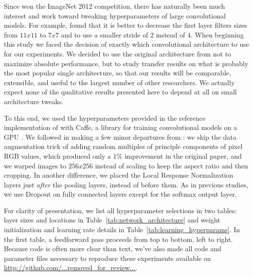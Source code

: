 Since \cite{Krizhevsky-2012} won the ImageNet 2012 competition, there has naturally been much interest and work toward tweaking hyperparameters of large convolutional models. For example, \cite{Zeiler+et+al-arxiv2013b} found that it is better to decrease the first layer filters sizes from $11x11$ to $7x7$ and to use a smaller stride of $2$ instead of $4$. When beginning this study we faced the decision of exactly which convolutional architecture to use for our experiments. We decided to use the original architecture from \cite{Krizhevsky-2012} not to maximize absolute performance, but to study transfer results on what is probably the most popular single architecture, so that our results will be comparable, extensible, and useful to the largest number of other researchers. We actually expect none of the qualitative results presented here to depend at all on small architecture tweaks.

To this end, we used the hyperparameters provided in the reference implementation of  \cite{Krizhevsky-2012} with Caffe, a library for training convolutional models on a GPU \cite{donahue+jia-2013-arxiv}. We followed \cite{donahue+jia-2013-arxiv} in making a few minor departures from \cite{Krizhevsky-2012}: we skip the data augmentation trick of adding random multiples of principle components of pixel RGB values, which produced only a $1\%$ improvement in the original paper, and we warped images to $256x256$ instead of scaling to keep the aspect ratio and then cropping. In another difference, we placed the Local Response Normalization layers just \emph{after} the pooling layers, instead of before them. As in previous studies, we use Dropout \citep{Hinton-et-al-arxiv2012} on fully connected layers except for the softmax output layer.


For clarity of presentation, we list all hyperparameter selections in two tables: layer sizes and locations in Table~\ref{tab:network_architecture} and weight initialization and learning rate details in Table~\ref{tab:learning_hyperparams}. In the first table, a feedforward pass proceeds from top to bottom, left to right. Because code is often more clear than text, we've also made all code and parameter files necessary to reproduce these experiments available on \url{http://github.com/...removed_for_review...}.


